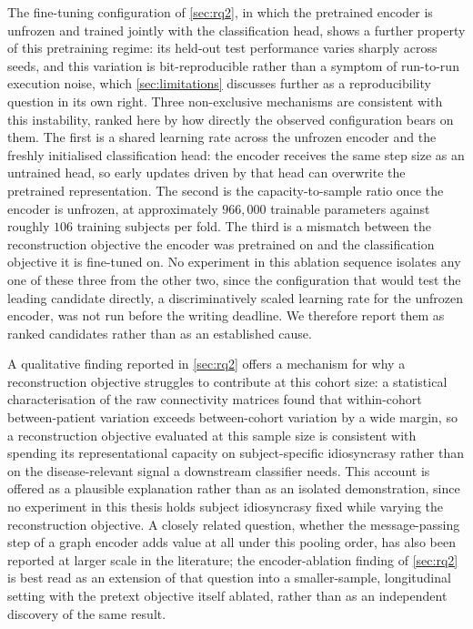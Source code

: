 The fine-tuning configuration of \autoref{sec:rq2}, in which the pretrained encoder is unfrozen and
trained jointly with the classification head, shows a further property of this pretraining
regime: its held-out test performance varies sharply across seeds, and this variation is
bit-reproducible rather than a symptom of run-to-run execution noise, which
\autoref{sec:limitations} discusses further as a reproducibility question in its own right.
Three non-exclusive mechanisms are consistent with this instability, ranked here by how
directly the observed configuration bears on them. The first is a shared learning rate
across the unfrozen encoder and the freshly initialised classification head: the encoder
receives the same step size as an untrained head, so early updates driven by that head can
overwrite the pretrained representation. The second is the capacity-to-sample ratio once
the encoder is unfrozen, at approximately $966{,}000$ trainable parameters against roughly
$106$ training subjects per fold. The third is a mismatch between the reconstruction
objective the encoder was pretrained on and the classification objective it is fine-tuned
on. No experiment in this ablation sequence isolates any one of these three from the other
two, since the configuration that would test the leading candidate directly, a
discriminatively scaled learning rate for the unfrozen encoder, was not run before the
writing deadline. We therefore report them as ranked candidates rather than as an
established cause.

A qualitative finding reported in \autoref{sec:rq2} offers a mechanism for why a
reconstruction objective struggles to contribute at this cohort size: a statistical
characterisation of the raw connectivity matrices found that within-cohort between-patient
variation exceeds between-cohort variation by a wide margin, so a reconstruction objective
evaluated at this sample size is consistent with spending its representational capacity on
subject-specific idiosyncrasy rather than on the disease-relevant signal a downstream
classifier needs. This account is offered as a plausible explanation rather than as an
isolated demonstration, since no experiment in this thesis holds subject idiosyncrasy fixed
while varying the reconstruction objective. A closely related question, whether the
message-passing step of a graph encoder adds value at all under this pooling order, has
also been reported at larger scale in the literature; the encoder-ablation finding of
\autoref{sec:rq2} is best read as an extension of that question into a smaller-sample,
longitudinal setting with the pretext objective itself ablated, rather than as an
independent discovery of the same result.

